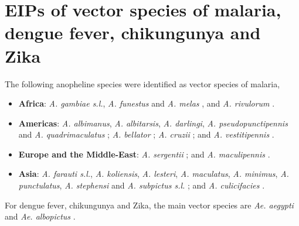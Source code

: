 \documentclass[12pt]{article}
\begin{document}
{\section{EIPs of vector species of malaria, dengue fever, chikungunya and Zika}
The following anopheline species were identified as vector species of malaria,

\begin{itemize}
	\item \textbf{Africa}: \textit{A. gambiae s.l.}, \textit{A. funestus} and \textit{A. melas} \citep{sinka2012global}, and \textit{A. rivulorum} \citep{wilkes1996anopheles}.
	\item \textbf{Americas}: \textit{A. albimanus}, \textit{A. albitarsis}, \textit{A. darlingi}, \textit{A. pseudopunctipennis} and \textit{A. quadrimaculatus} \citep{sinka2012global}; \textit{A. bellator}  \citep{forattini1999role,lorenz2012morphometrical}; \textit{A. cruzii} \citep{lorenz2012morphometrical}; and \textit{A. vestitipennis} \citep{sinka2010dominant}.
	\item \textbf{Europe and the Middle-East}: \textit{A. sergentii} \citep{sinka2012global}; and \textit{A. maculipennis} \citep{hackett1935varieties}.
	\item \textbf{Asia}: \textit{A. farauti s.l.}, \textit{A. koliensis}, \textit{A. lesteri}, \textit{A. maculatus}, \textit{A. minimus}, \textit{A. punctulatus}, \textit{A. stephensi} and \textit{A. subpictus s.l.} \citep{sinka2012global}; and \textit{A. culicifacies} \citep{green1980chromosomal}.
\end{itemize}

For dengue fever, chikungunya and Zika, the main vector species are \textit{Ae. aegypti} and \textit{Ae. albopictus} \citep{kraemer2015global,grard2014zika,benelli2016declining}. 


}
\end{document}
